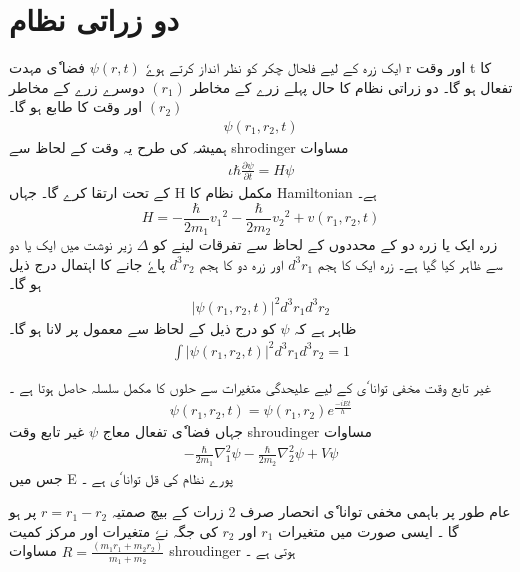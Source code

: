 \section{ دو   زراتی نظام} 

ایک زرہ کے لیے فلحال چکر کو نظر انداز کرتے ہوےٗ  
$ \psi ( r , t ) $
فضا ٗی مہدت r اور وقت t کا تفعال ہو گا۔ دو زراتی نظام کا حال پہلے زرے کے مخاطر 
$ ( r_1 ) $
دوسرے زرے کے مخاطر 
$ ( r_2 ) $
اور وقت کا طابع ہو گا۔ 
\begin{align}   
\psi ( r_1 , r_2 , t ) 
\end{align}
 ہمیشہ کی طرح یہ وقت کے لحاظ سے shrodinger مساوات 
\begin{align}
\iota \hbar \frac{ \partial \psi }{ \partial t } = H \psi
\end{align}
کے تحت ارتقا کرے گا۔ جہاں H مکمل  نظام کا Hamiltonian  ہے۔
\begin{equation}
H = - \frac{ \hbar }{ 2 m_1 } {v_1}^2  -  \frac{ \hbar }{ 2 m_2 } { v_2 }^2 +  v( r_1 , r_2 , t )
\end{equation}
زرہ ایک یا زرہ دو کے محددوں کے لحاظ سے  تفرقات لینے کو 
$ \Delta $
زیر نوشت میں ایک یا دو سے ظاہر کیا گیا ہے۔ زرہ ایک کا ہجم 
$ d^3 r_1 $
اور زرہ دو کا ہجم
$ d^3 r_2 $
پاےٗ جانے کا اہتمال درج ذیل ہو گا۔ 
\begin{align}
| \psi ( r_1 , r_2 , t ) |^2 { d^3 } { r_1 }  { d^3 } { r_2 }
\end{align}
ظاہر ہے کہ 
$ \psi $
کو درج ذیل کے لحاظ سے معمول پر لانا ہو گا۔ 
\begin{align}
\int | \psi ( r_1 , r_2 , t ) |^2 { d^3 } { r_1 } { d^3 } { r_2 } = 1
\end{align}

\newpage

غیر تابع وقت مخفی توانا ٗی کے لیے علیحدگی  متغیرات  سے حلوں کا مکمل سلسلہ حاصل ہوتا ہے ۔ 
\begin{align}
\psi ( r_1 , r_2 , t ) =  \psi ( r_1 , r_2 ) {e}^\frac{ - i E t }{h}  
\end{align}
جہاں فضا ٗی تفعال معاج 
$ \psi $
غیر تابع وقت shroudinger مساوات 
\begin{align}
-\frac{ \hbar }{ 2 m_1 }  {\nabla_1^2} { \psi } - \frac{ \hbar }{ 2 m_2 } \nabla_2^2 { \psi } + V \psi 
\end{align}
جس میں E پورے نظام کی قل توانا ٗی ہے ۔ 

عام طور پر  باہمی مخفی توانا ٗی انحصار صرف 2 زرات کے بیچ صمتیہ
$ r = r_1 - r_2 $
پر ہو گا ۔ ایسی صورت میں متغیرات 
$ r_1  $
اور 
$  r_2  $
کی جگہ نےٗ متغیرات  اور مرکز کمیت
$  R = \frac{ ( m_1 r_1 + m_2 r_2 ) }{ m_1 + m_2 } $
مساوات shroudinger ہوتی ہے ۔ 


